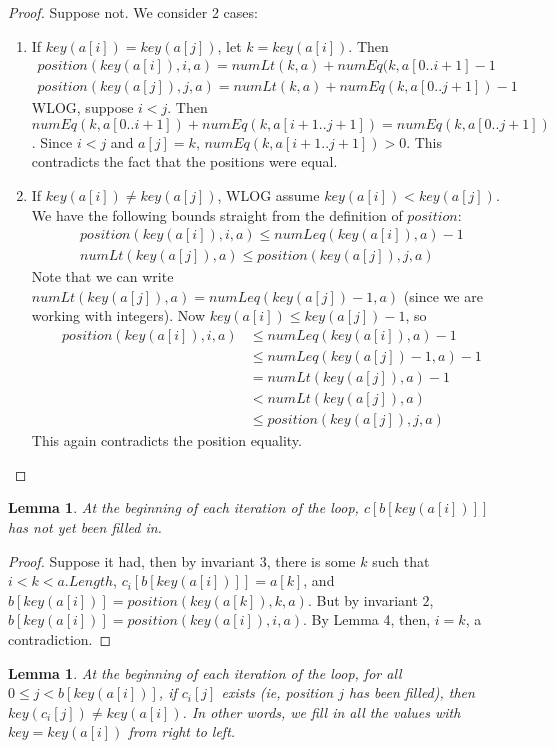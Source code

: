 \documentclass{article}
\newtheorem{lemma}[theorem]{Lemma}
\begin{document}
\begin{proof}
Suppose not. We consider 2 cases:
\begin{enumerate}
\item
If $key(a[i]) = key(a[j])$, let $k = key(a[i])$. Then 
\begin{align*}
position(key(a[i]), i, a) = numLt(k, a) + numEq(k, a[0..i+1] - 1 \\
position(key(a[j]), j, a) = numLt(k, a) + numEq(k, a[0..j+1]) - 1
\end{align*}
WLOG, suppose $i < j$. Then $numEq(k, a[0..i+1]) + numEq(k, a[i+1..j+1]) = numEq(k, a[0..j+1])$. Since $i < j$ and $a[j] = k$, $numEq(k, a[i+1..j+1]) > 0$. This contradicts the fact that the positions were equal.
\item
If $key(a[i]) \neq key(a[j])$, WLOG assume $key(a[i]) < key(a[j])$. We have the following bounds straight from the definition of $position$:
\begin{align*}
position(key(a[i]), i, a) \leq numLeq(key(a[i]), a) - 1 \\
numLt(key(a[j]), a) \leq position(key(a[j]), j, a) 
\end{align*}
Note that we can write $numLt(key(a[j]), a) = numLeq(key(a[j]) - 1, a)$ (since we are working with integers). Now $key(a[i]) \leq key(a[j]) - 1$, so 
\begin{align*}
position(key(a[i]), i, a) &\leq numLeq(key(a[i]), a) - 1  \\
&\leq numLeq(key(a[j]) - 1, a) - 1 \\
&= numLt(key(a[j]), a) - 1 \\
&< numLt(key(a[j]), a) \\
&\leq position(key(a[j]), j, a)
\end{align*}
This again contradicts the position equality.
\end{enumerate}
\end{proof}
\begin{lemma}
At the beginning of each iteration of the loop, $c[b[key(a[i])]]$ has not yet been filled in.
\end{lemma}
\begin{proof}
Suppose it had, then by invariant 3, there is some $k$ such that $i < k < a.Length$, $c_i[b[key(a[i])]] = a[k]$, and $b[key(a[i])] = position(key(a[k]), k, a)$. But by invariant $2$, $b[key(a[i])] = position(key(a[i]), i, a)$. By Lemma 4, then, $i = k$, a contradiction.
\end{proof}
\begin{lemma}
At the beginning of each iteration of the loop, for all $0 \leq j < b[key(a[i])]$, if $c_i[j]$ exists (ie, position $j$ has been filled), then $key(c_i[j]) \neq key(a[i])$. In other words, we fill in all the values with $key = key(a[i])$ from right to left.
\end{lemma}
\end{document}
